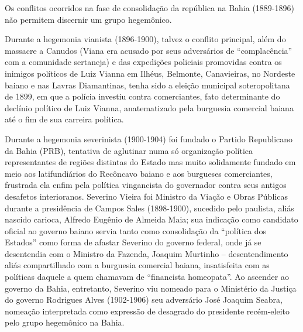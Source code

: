Os conflitos ocorridos na fase de consolidação da república na Bahia (1889-1896) não permitem discernir um grupo hegemônico.

Durante a hegemonia vianista (1896-1900), talvez o conflito principal, além do massacre a Canudos (Viana era acusado por seus adversários de ``complacência'' com a comunidade sertaneja) e das expedições policiais promovidas contra os inimigos políticos de Luiz Vianna em Ilhéus, Belmonte, Canavieiras, no Nordeste baiano e nas Lavras Diamantinas, tenha sido a eleição municipal soteropolitana de 1899, em que a polícia investiu contra comerciantes, fato determinante do declínio político de Luiz Vianna, anatematizado pela burguesia comercial baiana até o fim de sua carreira política. 

Durante a hegemonia severinista (1900-1904) foi fundado o Partido Republicano da Bahia (PRB), tentativa de aglutinar numa só organização política representantes de regiões distintas do Estado mas muito solidamente fundado em meio aos latifundiários do Recôncavo baiano e aos burgueses comerciantes, frustrada ela enfim pela política vingancista do governador contra seus antigos desafetos interioranos. Severino Vieira foi Ministro da Viação e Obras Públicas durante a presidência de Campos Sales (1898-1900), sucedido pelo paulista, aliás nascido carioca, Alfredo Eugênio de Almeida Maia; sua indicação como candidato oficial ao governo baiano servia tanto como consolidação da ``política dos Estados'' como forma de afastar Severino do governo federal, onde já se desentendia com o Ministro da Fazenda, Joaquim Murtinho -- desentendimento aliás compartilhado com a burguesia comercial baiana, insatisfeita com as políticas daquele a quem chamavam de ``financista homeopata''. Ao ascender ao governo da Bahia, entretanto, Severino viu nomeado para o Ministério da Justiça do governo Rodrigues Alves (1902-1906) seu adversário José Joaquim Seabra, nomeação interpretada como expressão de desagrado do presidente recém-eleito pelo grupo hegemônico na Bahia. 

